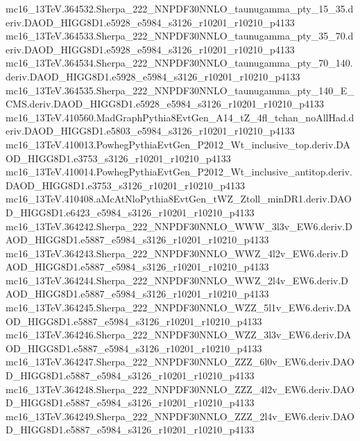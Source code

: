 \begin{scriptsize}
mc16\_13TeV.364532.Sherpa\_222\_NNPDF30NNLO\_taunugamma\_pty\_15\_35.deriv.DAOD\_HIGG8D1.e5928\_e5984\_s3126\_r10201\_r10210\_p4133 \\
mc16\_13TeV.364533.Sherpa\_222\_NNPDF30NNLO\_taunugamma\_pty\_35\_70.deriv.DAOD\_HIGG8D1.e5928\_e5984\_s3126\_r10201\_r10210\_p4133 \\
mc16\_13TeV.364534.Sherpa\_222\_NNPDF30NNLO\_taunugamma\_pty\_70\_140.deriv.DAOD\_HIGG8D1.e5928\_e5984\_s3126\_r10201\_r10210\_p4133 \\
mc16\_13TeV.364535.Sherpa\_222\_NNPDF30NNLO\_taunugamma\_pty\_140\_E\_CMS.deriv.DAOD\_HIGG8D1.e5928\_e5984\_s3126\_r10201\_r10210\_p4133 \\
mc16\_13TeV.410560.MadGraphPythia8EvtGen\_A14\_tZ\_4fl\_tchan\_noAllHad.deriv.DAOD\_HIGG8D1.e5803\_e5984\_s3126\_r10201\_r10210\_p4133 \\
mc16\_13TeV.410013.PowhegPythiaEvtGen\_P2012\_Wt\_inclusive\_top.deriv.DAOD\_HIGG8D1.e3753\_s3126\_r10201\_r10210\_p4133 \\
mc16\_13TeV.410014.PowhegPythiaEvtGen\_P2012\_Wt\_inclusive\_antitop.deriv.DAOD\_HIGG8D1.e3753\_s3126\_r10201\_r10210\_p4133 \\
mc16\_13TeV.410408.aMcAtNloPythia8EvtGen\_tWZ\_Ztoll\_minDR1.deriv.DAOD\_HIGG8D1.e6423\_e5984\_s3126\_r10201\_r10210\_p4133 \\
mc16\_13TeV.364242.Sherpa\_222\_NNPDF30NNLO\_WWW\_3l3v\_EW6.deriv.DAOD\_HIGG8D1.e5887\_e5984\_s3126\_r10201\_r10210\_p4133 \\
mc16\_13TeV.364243.Sherpa\_222\_NNPDF30NNLO\_WWZ\_4l2v\_EW6.deriv.DAOD\_HIGG8D1.e5887\_e5984\_s3126\_r10201\_r10210\_p4133 \\
mc16\_13TeV.364244.Sherpa\_222\_NNPDF30NNLO\_WWZ\_2l4v\_EW6.deriv.DAOD\_HIGG8D1.e5887\_e5984\_s3126\_r10201\_r10210\_p4133 \\
mc16\_13TeV.364245.Sherpa\_222\_NNPDF30NNLO\_WZZ\_5l1v\_EW6.deriv.DAOD\_HIGG8D1.e5887\_e5984\_s3126\_r10201\_r10210\_p4133 \\
mc16\_13TeV.364246.Sherpa\_222\_NNPDF30NNLO\_WZZ\_3l3v\_EW6.deriv.DAOD\_HIGG8D1.e5887\_e5984\_s3126\_r10201\_r10210\_p4133 \\
mc16\_13TeV.364247.Sherpa\_222\_NNPDF30NNLO\_ZZZ\_6l0v\_EW6.deriv.DAOD\_HIGG8D1.e5887\_e5984\_s3126\_r10201\_r10210\_p4133 \\
mc16\_13TeV.364248.Sherpa\_222\_NNPDF30NNLO\_ZZZ\_4l2v\_EW6.deriv.DAOD\_HIGG8D1.e5887\_e5984\_s3126\_r10201\_r10210\_p4133 \\
mc16\_13TeV.364249.Sherpa\_222\_NNPDF30NNLO\_ZZZ\_2l4v\_EW6.deriv.DAOD\_HIGG8D1.e5887\_e5984\_s3126\_r10201\_r10210\_p4133 \\

\end{scriptsize}
